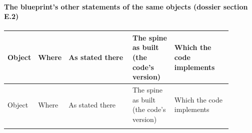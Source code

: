 \paragraph{The blueprint's other statements of the same objects (dossier section E.2)}\label{sec:gen-spine-E2}

\begin{landscape}
{\footnotesize
\begin{longtable}{@{}>{\raggedright\arraybackslash}p{0.059\linewidth}>{\raggedright\arraybackslash}p{0.078\linewidth}>{\raggedright\arraybackslash}p{0.300\linewidth}>{\raggedright\arraybackslash}p{0.190\linewidth}>{\raggedright\arraybackslash}p{0.265\linewidth}@{}}
\toprule
Object & Where & As stated there & The spine as built (the code's version) & Which the code implements \\
\midrule
\endfirsthead
\toprule
Object & Where & As stated there & The spine as built (the code's version) & Which the code implements \\
\midrule
\endhead
\bottomrule
\endfoot

\end{longtable}}
\end{landscape}
